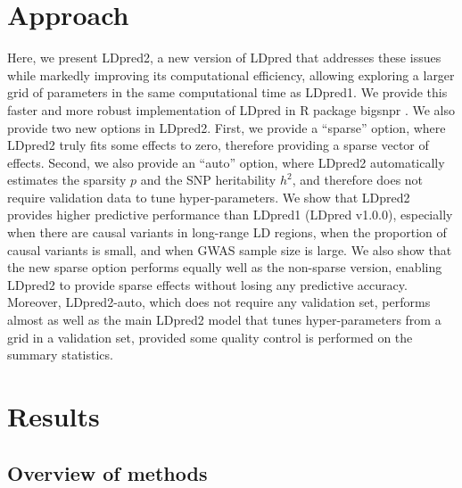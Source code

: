 \documentclass{bioinfo}
\begin{document}

\section{Approach}

Here, we present LDpred2, a new version of LDpred that addresses these issues while markedly improving its computational efficiency, allowing exploring a larger grid of parameters in the same computational time as LDpred1.
We provide this faster and more robust implementation of LDpred in R package bigsnpr \cite[]{prive2017efficient}.
We also provide two new options in LDpred2. First, we provide a ``sparse'' option, where LDpred2 truly fits some effects to zero, therefore providing a sparse vector of effects. Second, we also provide an ``auto'' option, where LDpred2 automatically estimates the sparsity $p$ and the SNP heritability $h^2$, and therefore does not require validation data to tune hyper-parameters.
We show that LDpred2 provides higher predictive performance than LDpred1 (LDpred v1.0.0), especially when there are causal variants in long-range LD regions, when the proportion of causal variants is small, and when GWAS sample size is large.
We also show that the new sparse option performs equally well as the non-sparse version, enabling LDpred2 to provide sparse effects without losing any predictive accuracy.
Moreover, LDpred2-auto, which does not require any validation set, performs almost as well as the main LDpred2 model that tunes hyper-parameters from a grid in a validation set, provided some quality control is performed on the summary statistics.


\section{Results}

\subsection*{Overview of methods}
\end{document}
